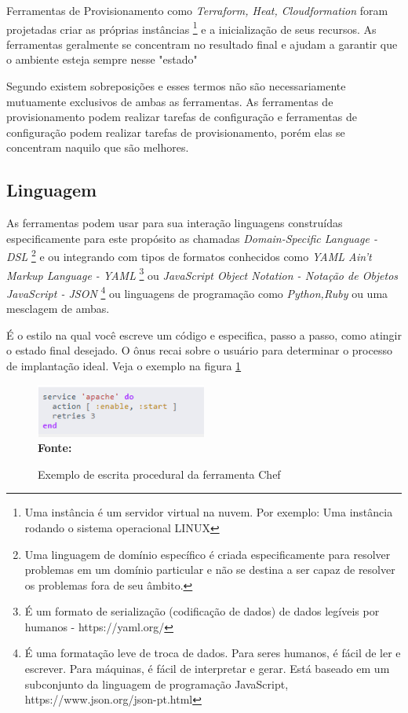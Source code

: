 Ferramentas de Provisionamento como \textit{Terraform, Heat, Cloudformation} foram projetadas criar as próprias instâncias \footnote{Uma instância é um servidor virtual na nuvem. Por exemplo: Uma instância rodando o sistema operacional LINUX} e a inicialização de seus recursos. As ferramentas geralmente se concentram no resultado final e ajudam a garantir que o ambiente esteja sempre nesse "estado" 

\hfill
Segundo  existem sobreposições e esses termos não são necessariamente mutuamente exclusivos de ambas as ferramentas. As ferramentas de provisionamento podem realizar tarefas de configuração e ferramentas de configuração podem realizar tarefas de provisionamento, porém elas se concentram naquilo que são melhores. 


\subsection{Linguagem}

 As ferramentas podem usar para sua interação linguagens construídas especificamente para este propósito as chamadas \textit{Domain-Specific Language - DSL} 
  \footnote{Uma linguagem de domínio específico é criada especificamente para resolver problemas em um domínio particular e não se destina a ser capaz de resolver os problemas fora de seu âmbito. } e ou integrando com tipos de formatos conhecidos como \textit{ YAML Ain't  Markup Language - YAML} \footnote{É um formato de serialização (codificação de dados) de dados legíveis por humanos -  https://yaml.org/ } ou \textit{JavaScript Object Notation - Notação de Objetos JavaScript - JSON} \footnote{ É uma formatação leve de troca de dados. Para seres humanos, é fácil de ler e escrever. Para máquinas, é fácil de interpretar e gerar. Está baseado em um subconjunto da linguagem de programação JavaScript, https://www.json.org/json-pt.html }
  ou linguagens de programação como \textit{Python,Ruby} ou uma mesclagem de ambas.
 
  
  É o estilo na qual você escreve um código e especifica, passo a passo, como atingir o estado final desejado. O ônus recai sobre o usuário para determinar o processo de implantação ideal. Veja o exemplo na figura \ref{fig:figura1}

\begin{figure}[ht]
	\centering	
	\caption[\hspace{0.1cm}Exemplo procedural]{Exemplo de escrita procedural da ferramenta Chef}
	\vspace{-0.4cm}
	\includegraphics[width=0.5\textwidth]{figuras/chef-io-exemplo-procedural.png}
	 \vspace{-0.2cm}
	\\\textbf{\footnotesize Fonte: \cite{chef01} }
	\label{fig:figura1}
\end{figure}
\vspace{-0.5cm}
  
